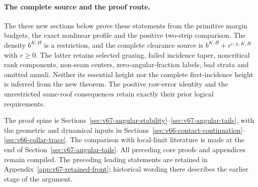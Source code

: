 \paragraph{The complete source and the proof route.}
The three new sections below prove these statements from the primitive
margin budgets, the exact nonlinear profile and the positive two-strip
comparison. The density $b^{K,H}$ is a restriction, and the complete
clearance source is $b^{K,H}+r^{\varepsilon,\chi,K,H}$ with $r\ge0$.
The latter retains selected grazing, failed incidence taper, noncritical
rank components, non-seam centers, zero-angular-fraction labels, bad
strata and omitted annuli. Neither its essential height nor the complete
first-incidence height is inferred from the new theorem. The positive
raw-error identity and the unrestricted same-roof consequences retain
exactly their prior logical requirements.

The proof spine is Sections~\ref{sec:v67-angular-stability}--\ref{sec:v67-angular-tails},
with the geometric and dynamical inputs in
Sections~\ref{sec:v66-contact-continuation}--\ref{sec:v66-collar-trace}.
The comparison with local-limit literature is made at the end of
Section~\ref{sec:v67-angular-tails}. All preceding core proofs and
appendices remain compiled. The preceding leading statements are
retained in Appendix~\ref{app:v67-retained-front}; historical wording
there describes the earlier stage of the argument.

